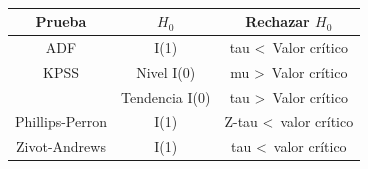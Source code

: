 \begin{f}{\ }
	
	\begin{center}
		\begin{tabular}{ c | c | c }
			Prueba            & \(H_{0}\)    & Rechazar \(H_{0}\)                     \\ \hline
			ADF             & I(1)       & tau \textless \, Valor crítico    \\ \hline
			KPSS            & Nivel I(0) & mu \textgreater \, Valor crítico  \\
			& Tendencia I(0) & tau \textgreater \, Valor crítico \\ \hline
			Phillips-Perron & I(1)       & Z-tau \textless \, valor crítico  \\ \hline
			Zivot-Andrews   & I(1)       & tau \textless \, valor crítico
		\end{tabular}
	\end{center}
	\medskip
	
\end{f}  

